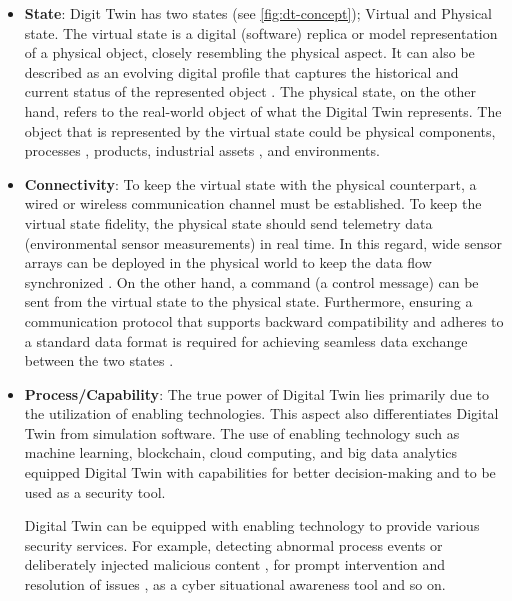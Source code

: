 \begin{itemize}
    \item \textbf{State}: Digit Twin has two states (see \ref{fig:dt-concept}); Virtual and Physical state. The virtual state is a digital (software) replica or model representation of a physical object, closely resembling the physical aspect. It can also be described as an evolving digital profile that captures the historical and current status of the represented object \cite{becueCyberFactorySecuringIndustry40with2018}. The physical state, on the other hand, refers to the real-world object of what the Digital Twin represents. The object that is represented by the virtual state could be physical components, processes \cite{wangDTCPNDigitalTwin2022, sousaELEGANTSecurityCritical2021, lopezDIGITALTWINSINTELLIGENT2021, rebecchiDigitalTwin5G2022, luongnguyenDigitalTwinIoT2022}, products, industrial assets \cite{dietzIntegratingDigitalTwin2020, eckhartEnhancingCyberSituational2019}, and environments.

    \item \textbf{Connectivity}: To keep the virtual state with the physical counterpart, a wired or wireless communication channel must be established. To keep the virtual state fidelity, the physical state should send  telemetry data (environmental sensor measurements) in real time. In this regard, wide sensor arrays can be deployed in the physical world to keep the data flow synchronized \cite{danilczykSmartGridAnomaly2021}. On the other hand, a command (a control message) can be sent from the virtual state to the physical state. Furthermore, ensuring a communication protocol that supports backward compatibility and adheres to a standard data format is required for achieving seamless data exchange between the two states \cite{atalayDigitalTwinsApproach2020}.

 
    \item \textbf{Process/Capability}: The true power of Digital Twin lies primarily due to the utilization of enabling technologies\cite{sousaELEGANTSecurityCritical2021}. This aspect also differentiates Digital Twin from simulation software. The use of enabling technology such as machine learning, blockchain, cloud computing, and big data analytics equipped Digital Twin with capabilities for better decision-making and to be used as a security tool. 
    
    Digital Twin can be equipped with enabling technology to provide various security services. For example,  detecting abnormal process events or deliberately injected malicious content \cite{saadImplementationIoTBasedDigital2020}, for prompt intervention and resolution of issues \cite{akbarianSecurityFrameworkDigital2021}, as a cyber situational awareness tool \cite{eckhartEnhancingCyberSituational2019} and so on.  
    

\end{itemize}
